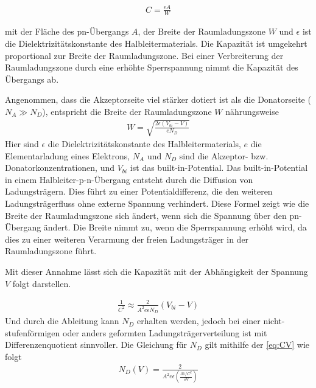 \begin{align}
    \label{eq:C}
    C = \frac{\epsilon A}{W}
\end{align}

mit der Fläche des pn-Übergangs $A$, der Breite der Raumladungszone $W$ und $\epsilon$ ist die Dielektrizitätskonstante des Halbleitermaterials. Die Kapazität ist umgekehrt proportional zur Breite der Raumladungszone. Bei einer Verbreiterung der Raumladungszone durch eine erhöhte Sperrspannung nimmt die Kapazität des Übergangs ab.

Angenommen, dass die Akzeptorseite viel stärker dotiert ist als die Donatorseite ($N_A \gg N_D$), entspricht die Breite der Raumladungszone $W$ nährungsweise 
\begin{align}
    \label{eq:W}
    W = \sqrt{\frac{2 \epsilon  (V_{bi} - V)}{e N_D}}
\end{align}
Hier sind $\epsilon$ die Dielektrizitätskonstante des Halbleitermaterials, $e$ die Elementarladung eines Elektrons, $N_A$ und $N_D$ sind die Akzeptor- bzw. Donatorkonzentrationen, und $V_{bi}$ ist das built-in-Potential. Das built-in-Potential in einem Halbleiter-p-n-Übergang entsteht durch die Diffusion von Ladungsträgern. Dies führt zu einer Potentialdifferenz, die den weiteren Ladungsträgerfluss ohne externe Spannung verhindert. Diese Formel zeigt wie die Breite der Raumladungszone sich ändert, wenn sich die Spannung über den pn-Übergang ändert. Die Breite nimmt zu, wenn die Sperrspannung erhöht wird, da dies zu einer weiteren Verarmung der freien Ladungsträger in der Raumladungszone führt.

Mit dieser Annahme lässt sich die Kapazität mit der Abhängigkeit der Spannung $V$ folgt darstellen.

\begin{align}
    \label{eq:CV}
    \frac{1}{C^2} \approx \frac{2}{A^2 e \epsilon N_D}(V_{bi} - V)
\end{align}
Und durch die Ableitung kann $N_D$ erhalten werden, jedoch bei einer nicht-stufenförmigen oder anders geformten Ladungsträgerverteilung ist mit Differenzenquotient sinnvoller. Die Gleichung für $N_D$ gilt mithilfe der \ref{eq:CV} wie folgt
\begin{align}
    \label{eq:ND}
    N_D(V)= \frac{2}{A^2 e \epsilon (\frac{\partial 1/C^2}{\partial V})}
\end{align}


